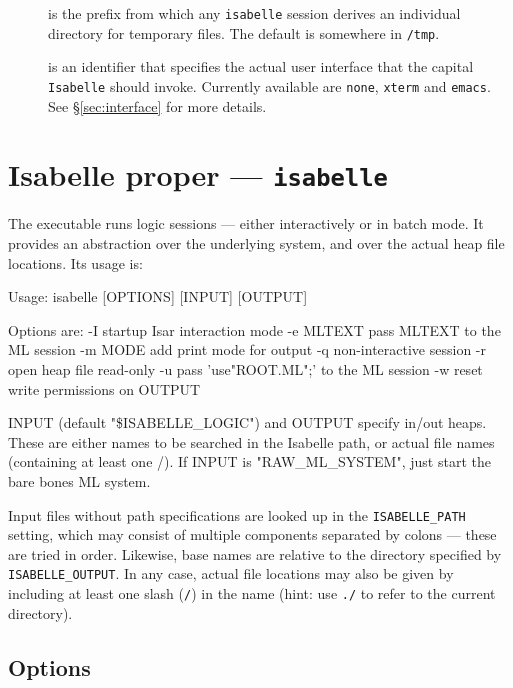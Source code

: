 \begin{description}
\item[] is the prefix from which any
  \texttt{isabelle} session derives an individual directory for
  temporary files.  The default is somewhere in \texttt{/tmp}.

\item[] is an identifier that specifies the
  actual user interface that the capital \texttt{Isabelle} should
  invoke.  Currently available are \texttt{none}, \texttt{xterm} and
  \texttt{emacs}. See \S\ref{sec:interface} for more details.

\end{description}


\section{Isabelle proper --- \texttt{isabelle}}

The  executable runs logic sessions --- either
interactively or in batch mode. It provides an abstraction over the
underlying {\ML} system, and over the actual heap file locations. Its
usage is:
\begin{ttbox}
Usage: isabelle [OPTIONS] [INPUT] [OUTPUT]

  Options are:
    -I           startup Isar interaction mode
    -e MLTEXT    pass MLTEXT to the ML session
    -m MODE      add print mode for output
    -q           non-interactive session
    -r           open heap file read-only
    -u           pass 'use"ROOT.ML";' to the ML session
    -w           reset write permissions on OUTPUT

  INPUT (default "\$ISABELLE_LOGIC") and OUTPUT specify in/out heaps.
  These are either names to be searched in the Isabelle path, or actual
  file names (containing at least one /).
  If INPUT is "RAW_ML_SYSTEM", just start the bare bones ML system.
\end{ttbox}
Input files without path specifications are looked up in the
\texttt{ISABELLE_PATH} setting, which may consist of multiple components
separated by colons --- these are tried in order.  Likewise, base names are
relative to the directory specified by \texttt{ISABELLE_OUTPUT}.  In any case,
actual file locations may also be given by including at least one slash
(\texttt{/}) in the name (hint: use \texttt{./} to refer to the current
directory).


\subsection*{Options}


